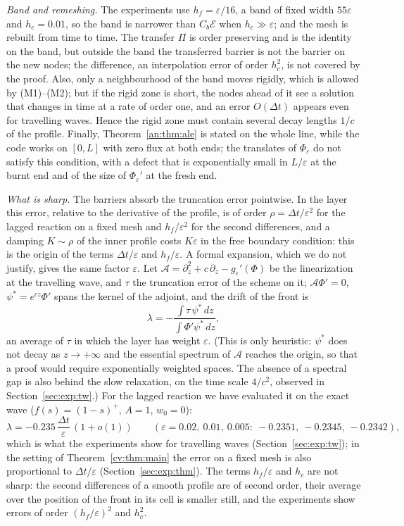 \documentclass[11pt]{amsart}
\theoremstyle{definition}
\theoremstyle{remark}
\newcommand{\ve}{\varepsilon}
\begin{document}
\emph{Band and remeshing.} The experiments use $h_f=\ve/16$, a band of fixed width
$55\ve$ and $h_c=0.01$, so the band is narrower than $C_b\mathcal E$ when $h_c\gg\ve$; and
the mesh is rebuilt from time to time. The transfer $\Pi$ is order preserving and is the
identity on the band, but outside the band the transferred barrier is not the barrier
on the new nodes; the difference, an interpolation error of order $h_c^2$, is not
covered by the proof. Also, only a neighbourhood of the band moves rigidly, which is
allowed by (M1)--(M2); but if the rigid zone is short, the nodes ahead of it see a
solution that changes in time at a rate of order one, and an error $O(\Delta t)$ appears
even for travelling waves. Hence the rigid zone must contain several decay lengths $1/c$
of the profile. Finally, Theorem~\ref{an:thm:ale} is stated on the whole line, while the
code works on $[0,L]$ with zero flux at both ends; the translates of $\Phi_\ve$ do not
satisfy this condition, with a defect that is exponentially small in $L/\ve$ at the burnt
end and of the size of $\Phi_\ve'$ at the fresh end.

\emph{What is sharp.} The barriers absorb the truncation error pointwise. In the layer
this error, relative to the derivative of the profile, is of order
$\rho=\Delta t/\ve^2$ for the lagged reaction on a fixed mesh and $h_f/\ve^2$ for the second
differences, and a damping $K\sim\rho$ of the inner profile costs $K\ve$ in the free
boundary condition: this is the origin of the terms $\Delta t/\ve$ and $h_f/\ve$. A formal
expansion, which we do not justify, gives the same factor $\ve$. Let
$\mathcal A=\partial_z^2+c\,\partial_z-g_\ve'(\Phi)$ be the linearization at the travelling
wave, and $\tau$ the truncation error of the scheme on it; $\mathcal A\Phi'=0$,
$\psi^*=e^{cz}\Phi'$ spans the kernel of the adjoint, and the drift of the front is
\[
\lambda=-\frac{\int\tau\,\psi^*\,dz}{\int\Phi'\psi^*\,dz},
\]
an average of $\tau$ in which the layer has weight $\ve$. (This is only heuristic: $\psi^*$
does not decay as $z\to+\infty$ and the essential spectrum of $\mathcal A$ reaches the
origin, so that a proof would require exponentially weighted spaces. The absence of a
spectral gap is also behind the slow relaxation, on the time scale $4/c^2$, observed in
Section~\ref{sec:exp:tw}.) For the lagged reaction we have
evaluated it on the exact wave ($f(s)=(1-s)^+$, $A=1$, $w_0=0$):
\begin{equation}\label{an:eq:solv}
\lambda=-0.235\,\frac{\Delta t}\ve\,(1+o(1))\qquad(\ve=0.02,\ 0.01,\ 0.005:\ -0.2351,\ -0.2345,\ -0.2342),
\end{equation}
which is what the experiments show for travelling waves (Section~\ref{sec:exp:tw}); in
the setting of Theorem~\ref{cv:thm:main} the error on a fixed mesh is also proportional
to $\Delta t/\ve$ (Section~\ref{sec:exp:thm}). The terms $h_f/\ve$ and $h_c$ are not sharp: the second
differences of a smooth profile are of second order, their average over the position
of the front in its cell is smaller still, and the experiments show errors of order
$(h_f/\ve)^2$ and $h_c^2$.
\end{document}

